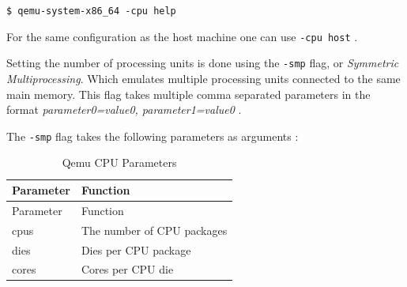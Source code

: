\documentclass[
  14pt,
  english,
  a4paper,
]{scrreprt}
\begin{document}
\texttt{\$\ qemu-system-x86\_64\ -cpu\ help}

For the same configuration as the host machine one can use
\texttt{-cpu\ host} .

Setting the number of processing units is done using the \texttt{-smp}
flag, or \emph{Symmetric Multiprocessing}. Which emulates multiple
processing units connected to the same main memory. This flag takes
multiple comma separated parameters in the format
\emph{parameter0=value0, parameter1=value0} .

The \texttt{-smp} flag takes the following parameters as arguments :

\hypertarget{tbl:qemu_cpu_param}{}
\begin{longtable}[]{@{}ll@{}}
\caption{\label{tbl:qemu_cpu_param}Qemu CPU Parameters}\tabularnewline
\toprule
\begin{minipage}[b]{0.16\columnwidth}\raggedright
Parameter\strut
\end{minipage} & \begin{minipage}[b]{0.41\columnwidth}\raggedright
Function\strut
\end{minipage}\tabularnewline
\midrule
\endfirsthead
\toprule
\begin{minipage}[b]{0.16\columnwidth}\raggedright
Parameter\strut
\end{minipage} & \begin{minipage}[b]{0.41\columnwidth}\raggedright
Function\strut
\end{minipage}\tabularnewline
\midrule
\endhead
\begin{minipage}[t]{0.16\columnwidth}\raggedright
cpus\strut
\end{minipage} & \begin{minipage}[t]{0.41\columnwidth}\raggedright
The number of CPU packages\strut
\end{minipage}\tabularnewline
\begin{minipage}[t]{0.16\columnwidth}\raggedright
dies\strut
\end{minipage} & \begin{minipage}[t]{0.41\columnwidth}\raggedright
Dies per CPU package\strut
\end{minipage}\tabularnewline
\begin{minipage}[t]{0.16\columnwidth}\raggedright
cores\strut
\end{minipage} & \begin{minipage}[t]{0.41\columnwidth}\raggedright
Cores per CPU die\strut
\end{minipage}\tabularnewline

\end{longtable}
\end{document}
